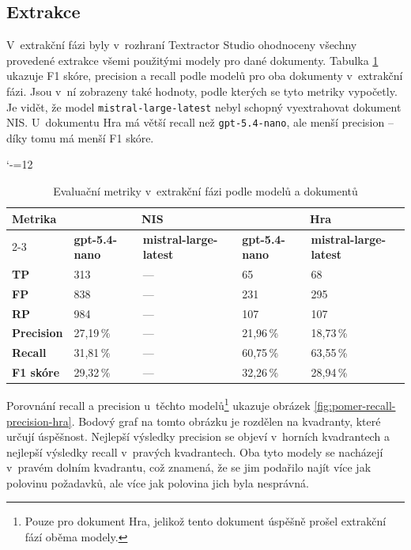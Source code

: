 \documentclass[czech, bc, kiv, he, iso690numb, pdf]{fasthesis}
\begin{document}
\subsection{Extrakce}
V~extrakční fázi byly v~rozhraní Textractor Studio ohodnoceny všechny provedené extrakce všemi použitými modely pro dané dokumenty. Tabulka \ref{tab:extrakce-vysledky} ukazuje F1 skóre, precision a recall podle modelů pro oba dokumenty v~extrakční fázi. Jsou v~ní zobrazeny také hodnoty, podle kterých se tyto metriky vypočetly. Je vidět, že model \verb"mistral-large-latest" nebyl schopný vyextrahovat dokument NIS. U~dokumentu Hra má větší recall než \verb"gpt-5.4-nano", ale menší precision -- díky tomu má menší F1 skóre.

\begin{table}
\catcode`-=12
\centering
\caption{Evaluační metriky v~extrakční fázi podle modelů a dokumentů}
\label{tab:extrakce-vysledky}
\begin{tabularx}{\textwidth}{X||XXXX}
\hline\hline
\textbf{Metrika} & \multicolumn{2}{c}{\textbf{NIS}} & \multicolumn{2}{c}{\textbf{Hra}} \\ \cline{2-3}\cline{4-5}
 & \textbf{gpt-5.4-nano} & \textbf{mistral-large-latest} & \textbf{gpt-5.4-nano} & \textbf{mistral-large-latest} \\ \hline
\textbf{TP} & 313 & --- & 65 & 68 \\ \hline
\textbf{FP} & 838 & --- & 231 & 295 \\ \hline
\textbf{RP} & 984 & --- & 107 & 107 \\ \hline
\textbf{Precision} & 27,19\,\% & --- & 21,96\,\% & 18,73\,\% \\ \hline
\textbf{Recall} & 31,81\,\% & --- & 60,75\,\% & 63,55\,\% \\ \hline
\textbf{F1 skóre} & 29,32\,\% & --- & 32,26\,\% & 28,94\,\% \\
\hline\hline
\end{tabularx}
\end{table}


Porovnání recall a precision u~těchto modelů\footnote{Pouze pro dokument Hra, jelikož tento dokument úspěšně prošel extrakční fází oběma modely.} ukazuje obrázek \ref{fig:pomer-recall-precision-hra}. Bodový graf na tomto obrázku je rozdělen na kvadranty, které určují úspěšnost. Nejlepší výsledky precision se objeví v~horních kvadrantech a nejlepší výsledky recall v~pravých kvadrantech. Oba tyto modely se nacházejí v~pravém dolním kvadrantu, což znamená, že se jim podařilo najít více jak polovinu požadavků, ale více jak polovina jich byla nesprávná.
\end{document}

